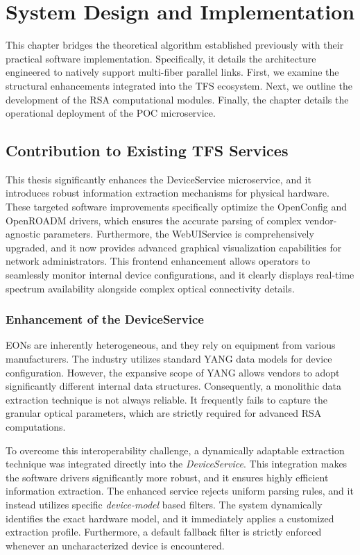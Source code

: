 \documentclass[12pt, a4paper, twoside, openright]{report}
\begin{document}
\chapter{System Design and Implementation}
This chapter bridges the theoretical algorithm established previously with their practical software implementation. Specifically, it details the architecture engineered to natively support multi-fiber parallel links. First, we examine the structural enhancements integrated into the TFS ecosystem. Next, we outline the development of the RSA computational modules. Finally, the chapter details the operational deployment of the POC microservice.
\section{Contribution to Existing TFS Services}
This thesis significantly enhances the DeviceService microservice, and it introduces robust information extraction mechanisms for physical hardware. These targeted software improvements specifically optimize the OpenConfig and OpenROADM drivers, which ensures the accurate parsing of complex vendor-agnostic parameters. Furthermore, the WebUIService is comprehensively upgraded, and it now provides advanced graphical visualization capabilities for network administrators. This frontend enhancement allows operators to seamlessly monitor internal device configurations, and it clearly displays real-time spectrum availability alongside complex optical connectivity details.
\subsection{Enhancement of the DeviceService}
EONs are inherently heterogeneous, and they rely on equipment from various manufacturers. The industry utilizes standard YANG data models for device configuration. However, the expansive scope of YANG allows vendors to adopt significantly different internal data structures. Consequently, a monolithic data extraction technique is not always reliable. It frequently fails to capture the granular optical parameters, which are strictly required for advanced RSA computations.

To overcome this interoperability challenge, a dynamically adaptable extraction technique was integrated directly into the \emph{DeviceService}. This integration makes the software drivers significantly more robust, and it ensures highly efficient information extraction. The enhanced service rejects uniform parsing rules, and it instead utilizes specific \emph{device-model} based filters. The system dynamically identifies the exact hardware model, and it immediately applies a customized extraction profile. Furthermore, a default fallback filter is strictly enforced whenever an uncharacterized device is encountered.
\end{document}
